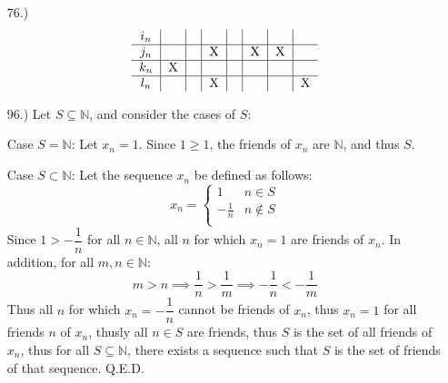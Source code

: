\documentclass[12pt]{article}
\begin{document}
\begin{itemize}
    \item [76.)]
    \[
    \begin{tabular}{c|c|c|c|c|c|c|c}
        $i_n$ & & & & & & & \\
        \hline
        $j_n$ & & & X & & X & X \\
        \hline
        $k_n$ & X & & & & & & \\
        \hline
        $l_n$ & & & X & & & & X \\
    \end{tabular}
    \]










    \item [96.)] Let $S\subseteq\mathbb{N}$, and consider the cases of $S$:

    Case $S=\mathbb N$: Let $x_n=1$. Since $1\geq 1$, the friends of $x_n$ are $\mathbb{N}$, and thus $S$.

    Case $S\subset\mathbb{N}$: Let the sequence $x_n$ be defined as follows:
    \[x_n=\begin{cases}
        1 & n\in S \\
        -\frac{1}{n} & n\notin S \\
    \end{cases}\]
    Since $1>-\dfrac{1}{n}$ for all $n\in\mathbb{N}$, all $n$ for which $x_n=1$ are friends of $x_n$. In addition, for all $m,n\in\mathbb{N}$:
    \[m>n\implies\dfrac{1}{n}>\dfrac{1}{m}\implies-\dfrac{1}{n}<-\frac{1}{m}\]
    Thus all $n$ for which $x_n=-\dfrac{1}{n}$ cannot be friends of $x_n$, thus $x_n=1$ for all friends $n$ of $x_n$, thusly all $n\in S$ are friends, thus $S$ is the set of all friends of $x_n$, thus for all $S\subseteq\mathbb{N}$, there exists a sequence such that $S$ is the set of friends of that sequence. Q.E.D.


\end{itemize}
\end{document}
